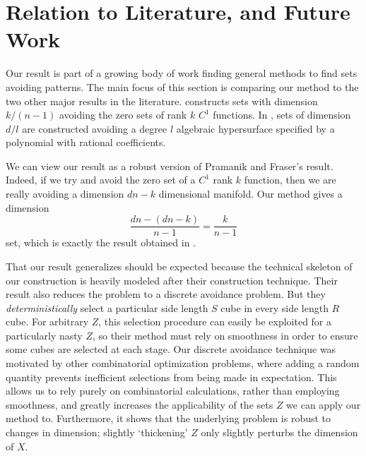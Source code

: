 \documentclass[usenames,dvipsnames]{article}
\theoremstyle{plain}
\theoremstyle{plain}
\begin{document}
\section{Relation to Literature, and Future Work}

Our result is part of a growing body of work finding general methods to find sets avoiding patterns. The main focus of this section is comparing our method to the two other major results in the literature. \cite{MalabikaRob} constructs sets with dimension $k/(n-1)$ avoiding the zero sets of rank $k$ $C^1$ functions. In \cite{Mathe}, sets of dimension $d/l$ are constructed avoiding a degree $l$ algebraic hypersurface specified by a polynomial with rational coefficients.

We can view our result as a robust version of Pramanik and Fraser's result. Indeed, if we try and avoid the zero set of a $C^1$ rank $k$ function, then we are really avoiding a dimension $dn - k$ dimensional manifold. Our method gives a dimension
%
\[ \frac{dn - (dn - k)}{n - 1} = \frac{k}{n - 1} \]
%
set, which is exactly the result obtained in \cite{MalabikaRob}.

That our result generalizes \cite{MalabikaRob} should be expected because the technical skeleton of our construction is heavily modeled after their construction technique. Their result also reduces the problem to a discrete avoidance problem. But they {\it deterministically} select a particular side length $S$ cube in every side length $R$ cube. For arbitrary $Z$, this selection procedure can easily be exploited for a particularly nasty $Z$, so their method must rely on smoothness in order to ensure some cubes are selected at each stage. Our discrete avoidance technique was motivated by other combinatorial optimization problems, where adding a random quantity prevents inefficient selections from being made in expectation. This allows us to rely purely on combinatorial calculations, rather than employing smoothness, and greatly increases the applicability of the sets $Z$ we can apply our method to. Furthermore, it shows that the underlying problem is robust to changes in dimension; slightly `thickening' $Z$ only slightly perturbs the dimension of $X$.
\end{document}
